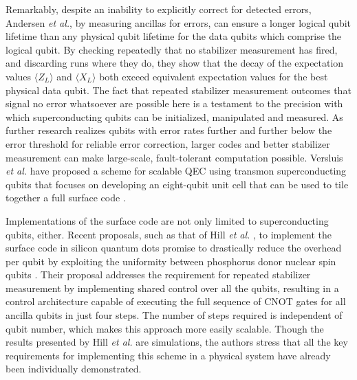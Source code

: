Remarkably, despite an inability to explicitly correct for detected errors,
Andersen \textit{et al.}, by measuring ancillas for errors, can ensure a longer
logical qubit lifetime than any physical qubit lifetime for the data qubits
which comprise the logical qubit. By checking repeatedly that no stabilizer
measurement has fired, and discarding runs where they do, they show that the
decay of the expectation values $\langle Z_L \rangle$ and $\langle X_L \rangle$
both exceed equivalent expectation values for the best physical data qubit. The
fact that repeated stabilizer measurement outcomes that signal no error
whatsoever are possible here is a testament to the precision with which
superconducting qubits can be initialized, manipulated and measured. As further
research realizes qubits with error rates further and further below the error
threshold for reliable error correction, larger codes and better stabilizer
measurement can make large-scale, fault-tolerant computation possible. Versluis
\textit{et al.} have proposed a scheme for scalable QEC using transmon
superconducting qubits that focuses on developing an eight-qubit unit cell that
can be used to tile together a full surface code \cite{Versluis_2017}.

Implementations of the surface code are not only limited to superconducting
qubits, either. Recent proposals, such as that of Hill \textit{et al.} , to
implement the surface code in silicon quantum dots promise to drastically reduce
the overhead per qubit by exploiting the uniformity between phosphorus donor
nuclear spin qubits \cite{silicon_surface_code}. Their proposal addresses the
requirement for repeated stabilizer measurement by implementing shared control
over all the qubits, resulting in a control architecture capable of executing
the full sequence of CNOT gates for all ancilla qubits in just four steps. The
number of steps required is independent of qubit number, which makes this
approach more easily scalable. Though the results presented by Hill \textit{et
  al.} are simulations, the authors stress that all the key requirements for
implementing this scheme in a physical system have already been individually
demonstrated.

